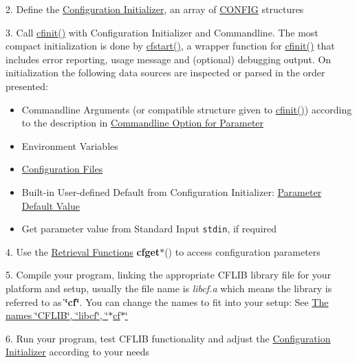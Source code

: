 2. Define the \hyperlink{config_initializer}{Configuration Initializer}, an array of \hyperlink{struct_c_o_n_f_i_g}{CONFIG} structures

3. Call \hyperlink{group__cflib__core_ge593ff607f853bd5fc16a16bb6759314}{cfinit()} with Configuration Initializer and Commandline. The most compact initialization is done by \hyperlink{group__cflib__core_gdcf24d678203bd09a0a3e05b8a986c65}{cfstart()}, a wrapper function for \hyperlink{group__cflib__core_ge593ff607f853bd5fc16a16bb6759314}{cfinit()} that includes error reporting, usage message and (optional) debugging output. On initialization the following data sources are inspected or parsed in the order presented:

\begin{itemize}
\item Commandline Arguments (or compatible structure given to \hyperlink{group__cflib__core_ge593ff607f853bd5fc16a16bb6759314}{cfinit()}) according to the description in \hyperlink{config_initializer_parameter_option}{Commandline Option for Parameter}\item Environment Variables\item \hyperlink{config_files}{Configuration Files}\item Built-in User-defined Default from Configuration Initializer: \hyperlink{config_initializer_parameter_default}{Parameter Default Value}\item Get parameter value from Standard Input {\tt stdin}, if required\end{itemize}


4. Use the \hyperlink{index_retrieval_functions}{Retrieval Functions} {\bf cfget$\ast$}() to access configuration parameters

5. Compile your program, linking the appropriate CFLIB library file for your platform and setup, usually the file name is {\em libcf.a\/} which means the library is referred to as {\bf \char`\"{}cf\char`\"{}}. You can change the names to fit into your setup: See \hyperlink{properties_names}{The names \char`\"{}CFLIB\char`\"{}, \char`\"{}libcf\char`\"{}, \char`\"{}$\ast$cf$\ast$\char`\"{}}

6. Run your program, test CFLIB functionality and adjust the \hyperlink{config_initializer}{Configuration Initializer} according to your needs

